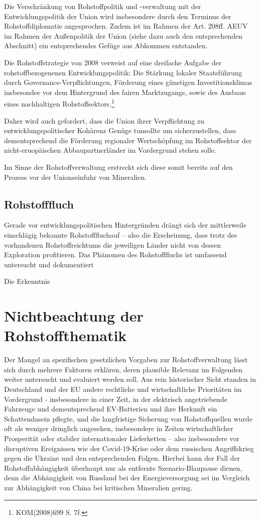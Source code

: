 \documentclass[12pt,a4paper,oneside]{book} %
\begin{document}
Die Verschränkung von Rohstoffpolitik und -verwaltung mit der Entwicklungspolitik der Union wird insbesondere durch den Terminus der Rohstoffdiplomatie angesprochen. Zudem ist im Rahmen der Art. 208ff. AEUV im Rahmen der Außenpolitik der Union (siehe dazu auch den entsprechenden Abschnitt) ein entsprechendes Gefüge aus Abkommen entstanden.

Die Rohstoffstrategie von 2008 verweist auf eine dreifache Aufgabe der rohstoffbezogenenen Entwicklungspolitik: Die Stärkung lokaler Staatsführung durch Governance-Verpflichtungen, Förderung eines günstigen Investitionsklimas insbesondee vor dem Hintergrund des fairen Marktzugangs, sowie des Ausbaus eines nachhaltigen Rohstoffsektors.\footnote{KOM(2008)699 S. 7f.}

Daher wird auch gefordert, dass die Union \glqq ihrer Verpflichtung zu entwicklungspolitischer Kohärenz Genüge tun\grqq sollte um sicherzustellen, dass dementsprechend die Förderung regionaler Wertschöpfung im Rohstoffsektor der nicht-eruopäischen Abbaupartnerländer im Vordergrund stehen solle.\autocite[15]{Kueblboeck_2023}

Im Sinne der Rohstoffverwaltung erstreckt sich diese somit bereits auf den Prozess vor der Unionseinfuhr von Mineralien.

\subsection{Rohstofffluch}

Gerade vor entwicklungspolitischen Hintergründen drängt sich der mittlerweile einschlägig bekannte \glqq Rohstofffluch\grqq auf -- also die Erscheinung, dass trotz des vorhandenen Rohstoffreichtums die jeweiligen Länder nicht von dessen Exploration profitieren. Das Phänomen des Rohstofffluchs ist umfassend untersucht und dokumentiert

Die Erkenntnis




\section{Nichtbeachtung der Rohstoffthematik}
Der Mangel an spezifischen gesetzlichen Vorgaben zur Rohstoffverwaltung lässt sich durch mehrere Faktoren erklären, deren plausible Relevanz im Folgenden weiter untersucht und evaluiert werden soll. Aus rein historischer Sicht standen in Deutschland und der EU andere rechtliche und wirtschaftliche Prioritäten im Vordergrund - insbesondere in einer Zeit, in der elektrisch angetriebende Fahrzeuge und dementsprechend EV-Batterien und ihre Herkunft ein Schattendasein pflegte, und die langfristige Sicherung von Rohstoffquellen wurde oft als weniger dringlich angesehen, insbesondere in Zeiten wirtschaftlicher Prosperität oder stabiler internationaler Lieferketten – also insbesondere vor disruptiven Ereignissen wie der Covid-19-Krise oder dem russischen Angriffskrieg gegen die Ukraine und den entsprechenden Folgen. Hierbei kann der Fall der Rohstoffabhängigkeit überhaupt nur als entfernte Szenario-Blaupause dienen, denn die Abhängigkeit von Russland bei der Energieversorgung sei im Vergleich zur Abhängigkeit von China bei kritischen Mineralien gering.\autocite{Rachman, FT}
\end{document}
